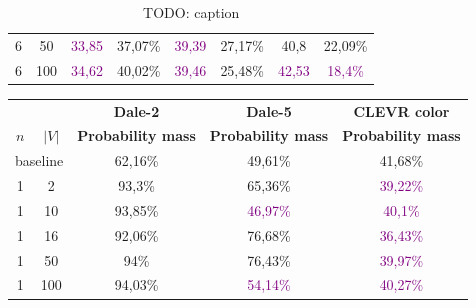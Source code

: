 \begin{table}[ht]
\begin{tabular}{cc|cc|cc|cc}
        {6}                           & {50}    & \textcolor{purple}{33,85}           & {37,07\%}                           & \textcolor{purple}{39,39}                & {27,17\%}                   & {40,8}                    & {22,09\%}                   \\
        {6}                           & {100}   & \textcolor{purple}{34,62}           & {40,02\%}                           & \textcolor{purple}{39,46}                & {25,48\%}                   & \textcolor{purple}{42,53} & \textcolor{purple}{18,4\%}  \\
        \bottomrule
    \end{tabular}
    \caption{TODO: caption}
    \label{TODO: label}
\end{table}

\begin{table}[ht]
    \centering
    \begin{tabular}{cc|c|c|c}
        \toprule
                                      &           & \multicolumn{1}{c}{\textbf{Dale-2}} & \multicolumn{1}{c}{\textbf{Dale-5}} & \multicolumn{1}{c}{\textbf{CLEVR color}} \\  \cmidrule(lr){3-3}\cmidrule(lr){4-4}\cmidrule(lr){5-5}
        $n$                           & $|V|$     & \textbf{Probability mass}           & \textbf{Probability mass}           & \textbf{Probability mass}                \\\midrule
        \multicolumn{2}{c|}{baseline} & {62,16\%} & {49,61\%}                           & {41,68\%}                                                                      \\\midrule
        {1}                           & {2}       & {93,3\%}                            & {65,36\%}                           & \textcolor{purple}{39,22\%}              \\
        {1}                           & {10}      & {93,85\%}                           & \textcolor{purple}{46,97\%}         & \textcolor{purple}{40,1\%}               \\
        {1}                           & {16}      & {92,06\%}                           & {76,68\%}                           & \textcolor{purple}{36,43\%}              \\
        {1}                           & {50}      & {94\%}                              & {76,43\%}                           & \textcolor{purple}{39,97\%}              \\
        {1}                           & {100}     & {94,03\%}                           & \textcolor{purple}{54,14\%}         & \textcolor{purple}{40,27\%}              \\

\end{tabular}
\end{table}
